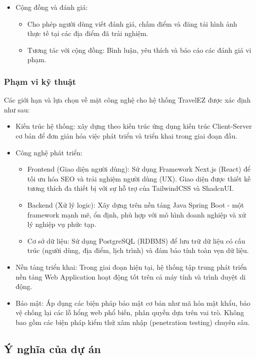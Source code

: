 \begin{itemize}
    \item Cộng đồng và đánh giá:
    \begin{itemize}
        \item Cho phép người dùng viết đánh giá, chấm điểm và đăng tải hình ảnh thực tế tại các địa điểm đã trải nghiệm.
        \item Tương tác với cộng đồng: Bình luận, yêu thích và báo cáo các đánh giá vi phạm.
    \end{itemize}
\end{itemize}

\subsubsection{Phạm vi kỹ thuật}
Các giới hạn và lựa chọn về mặt công nghệ cho hệ thống TravelEZ được xác định như sau:
\begin{itemize}
    \item Kiến trúc hệ thống: xây dựng theo kiến trúc ứng dụng kiến trúc Client-Server cơ bản để đơn giản hóa việc phát triển và triển khai trong giai đoạn đầu.
    \item Công nghệ phát triển:
        \begin{itemize}
            \item Frontend (Giao diện người dùng): Sử dụng Framework Next.js (React) để tối ưu hóa SEO và trải nghiệm người dùng (UX). Giao diện được thiết kế tương thích đa thiết bị với sự hỗ trợ của TailwindCSS và ShadcnUI.
            \item Backend (Xử lý logic): Xây dựng trên nền tảng Java Spring Boot - một framework mạnh mẽ, ổn định, phù hợp với mô hình doanh nghiệp và xử lý nghiệp vụ phức tạp.
            \item Cơ sở dữ liệu: Sử dụng PostgreSQL (RDBMS) để lưu trữ dữ liệu có cấu trúc (người dùng, địa điểm, lịch trình) và đảm bảo tính toàn vẹn dữ liệu.
        \end{itemize}
    \item Nền tảng triển khai: Trong giai đoạn hiện tại, hệ thống tập trung phát triển nền tảng Web Application hoạt động tốt trên cả máy tính và trình duyệt di động. 
    \item Bảo mật: Áp dụng các biện pháp bảo mật cơ bản như mã hóa mật khẩu, bảo vệ chống lại các lỗ hổng web phổ biến, phân quyền dựa trên vai trò. Không bao gồm các biện pháp kiểm thử xâm nhập (penetration testing) chuyên sâu.
\end{itemize}

\subsection{Ý nghĩa của dự án}

